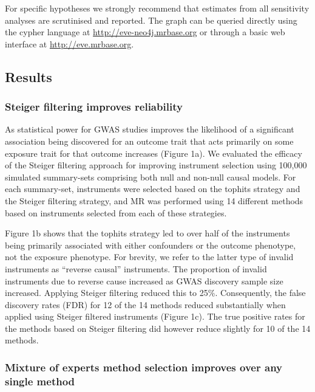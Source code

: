 \documentclass[]{article}
\begin{document}
For specific hypotheses we strongly recommend that estimates from all
sensitivity analyses are scrutinised and reported. The graph can be
queried directly using the cypher language at
\url{http://eve-neo4j.mrbase.org} or through a basic web interface at
\url{http://eve.mrbase.org}.

\subsection{Results}\label{results}

\subsubsection{Steiger filtering improves
reliability}\label{steiger-filtering-improves-reliability}

As statistical power for GWAS studies improves the likelihood of a
significant association being discovered for an outcome trait that acts
primarily on some exposure trait for that outcome increases (Figure 1a).
We evaluated the efficacy of the Steiger filtering approach for
improving instrument selection using 100,000 simulated summary-sets
comprising both null and non-null causal models. For each summary-set,
instruments were selected based on the tophits strategy and the Steiger
filtering strategy, and MR was performed using 14 different methods
based on instruments selected from each of these strategies.

Figure 1b shows that the tophits strategy led to over half of the
instruments being primarily associated with either confounders or the
outcome phenotype, not the exposure phenotype. For brevity, we refer to
the latter type of invalid instruments as ``reverse causal''
instruments. The proportion of invalid instruments due to reverse cause
increased as GWAS discovery sample size increased. Applying Steiger
filtering reduced this to 25\%. Consequently, the false discovery rates
(FDR) for 12 of the 14 methods reduced substantially when applied using
Steiger filtered instruments (Figure 1c). The true positive rates for
the methods based on Steiger filtering did however reduce slightly for
10 of the 14 methods.

\subsubsection{Mixture of experts method selection improves over any
single
method}\label{mixture-of-experts-method-selection-improves-over-any-single-method}
\end{document}
